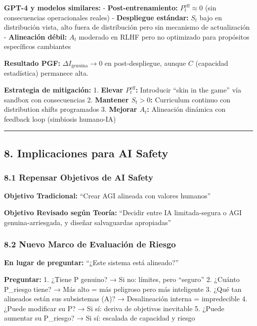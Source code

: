 \textbf{GPT-4 y modelos similares:} - \textbf{Post-entrenamiento:}
\(P^{\text{eff}}_t \approx 0\) (sin consecuencias operacionales reales)
- \textbf{Despliegue estándar:} \(S_t\) bajo en distribución vista, alto
fuera de distribución pero sin mecanismo de actualización -
\textbf{Alineación débil:} \(A_t\) moderado en RLHF pero no optimizado
para propósitos específicos cambiantes

\textbf{Resultado PGF:} \(\Delta I_{\text{genuina}} \to 0\) en
post-despliegue, aunque \(C\) (capacidad estadística) permanece alta.

\textbf{Estrategia de mitigación:} 1. \textbf{Elevar
\(P^{\text{eff}}_t\):} Introducir ``skin in the game'' vía sandbox con
consecuencias 2. \textbf{Mantener \(S_t > 0\):} Curriculum continuo con
distribution shifts programados 3. \textbf{Mejorar \(A_t\):} Alineación
dinámica con feedback loop (simbiosis humano-IA)

\begin{center}\rule{0.5\linewidth}{0.5pt}\end{center}

\subsection{8. Implicaciones para AI
Safety}\label{implicaciones-para-ai-safety}

\subsubsection{8.1 Repensar Objetivos de AI
Safety}\label{repensar-objetivos-de-ai-safety}

\textbf{Objetivo Tradicional:} ``Crear AGI alineada con valores
humanos''

\textbf{Objetivo Revisado según Teoría:} ``Decidir entre IA
limitada-segura o AGI genuina-arriesgada, y diseñar salvaguardas
apropiadas''

\subsubsection{8.2 Nuevo Marco de Evaluación de
Riesgo}\label{nuevo-marco-de-evaluaciuxf3n-de-riesgo}

\textbf{En lugar de preguntar:} ``¿Este sistema está alineado?''

\textbf{Preguntar:} 1. ¿Tiene P genuino? → Si no: límites, pero
``seguro'' 2. ¿Cuánto P\_riesgo tiene? → Más alto = más peligroso pero
más inteligente 3. ¿Qué tan alineados están sus subsistemas (A)? →
Desalineación interna = impredecible 4. ¿Puede modificar su P? → Si sí:
deriva de objetivos inevitable 5. ¿Puede aumentar su P\_riesgo? → Si sí:
escalada de capacidad y riesgo

